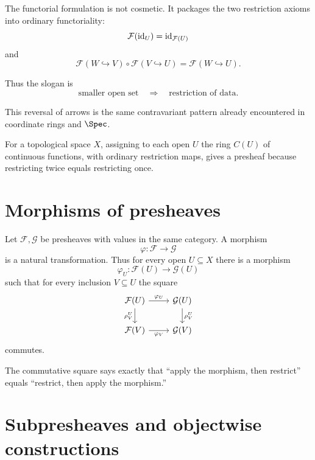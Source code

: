 The functorial formulation is not cosmetic.  It packages the two restriction axioms into
ordinary functoriality:
\[
\mathcal F(\operatorname{id}_U)=\operatorname{id}_{\mathcal F(U)}
\]
and
\[
\mathcal F(W\hookrightarrow V)\circ \mathcal F(V\hookrightarrow U)
=
\mathcal F(W\hookrightarrow U).
\]

Thus the slogan is
\[
\boxed{\text{smaller open set}\quad\Longrightarrow\quad\text{restriction of data}.}
\]

This reversal of arrows is the same contravariant pattern already encountered in coordinate
rings and $\Spec$.

\begin{example}\label{ex:vi12-expand-01}
For a topological space $X$, assigning to each open $U$ the ring $C(U)$ of continuous functions, with ordinary restriction maps, gives a presheaf because restricting twice equals restricting once.
\end{example}
\section{Morphisms of presheaves}

\begin{definition}
Let $\mathcal F,\mathcal G$ be presheaves with values in the same category.  A morphism
\[
\varphi:\mathcal F\longrightarrow\mathcal G
\]
is a natural transformation.  Thus for every open $U\subseteq X$ there is a morphism
\[
\varphi_U:\mathcal F(U)\longrightarrow\mathcal G(U)
\]
such that for every inclusion $V\subseteq U$ the square
\[
\begin{tikzcd}
\mathcal F(U)\arrow[r,"\varphi_U"]\arrow[d,"\rho^U_V"']&
\mathcal G(U)\arrow[d,"\rho^U_V"]\\
\mathcal F(V)\arrow[r,"\varphi_V"']&
\mathcal G(V)
\end{tikzcd}
\]
commutes.
\end{definition}



The commutative square says exactly that ``apply the morphism, then restrict'' equals
``restrict, then apply the morphism.''

\section{Subpresheaves and objectwise constructions}

